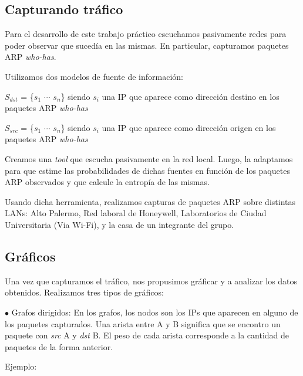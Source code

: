 \documentclass[10pt, a4paper]{article}
\begin{document}
\subsection{Capturando tráfico}
Para el desarrollo de este trabajo práctico escuchamos pasivamente redes para poder observar que sucedía en las mismas. En particular, capturamos paquetes ARP \emph{who-has}.

Utilizamos dos modelos de fuente de información:

$S_{dst}$ = \{$s_1$ $\cdots$ $s_n$\} siendo $s_i$ una IP que aparece como dirección destino en los paquetes ARP \emph{who-has}

$S_{src}$ = \{$s_1$ $\cdots$ $s_n$\} siendo $s_i$ una IP que aparece como dirección origen en los paquetes ARP \emph{who-has}

Creamos una \emph{tool} que escucha pasivamente en la red local. Luego, la adaptamos para que estime las probabilidades de dichas fuentes en función de los paquetes ARP observados y que calcule la entropía de las mismas.

Usando dicha herramienta, realizamos capturas de paquetes ARP sobre distintas LANs: Alto Palermo, Red laboral de Honeywell, Laboratorios de Ciudad Universitaria (Via Wi-Fi), y la casa de un integrante del grupo.

\subsection{Gráficos}

Una vez que capturamos el tráfico, nos propusimos gráficar y a analizar los datos obtenidos. Realizamos tres tipos de gráficos:

$\bullet$ Grafos dirigidos:
  En los grafos, los nodos son los IPs que aparecen en alguno de los paquetes capturados.
  Una arista entre A y B significa que se encontro un paquete con \emph{src} A y \emph{dst} B. El peso de cada arista corresponde a la cantidad de paquetes de la forma anterior.
  
  Ejemplo:
  
\end{document}
